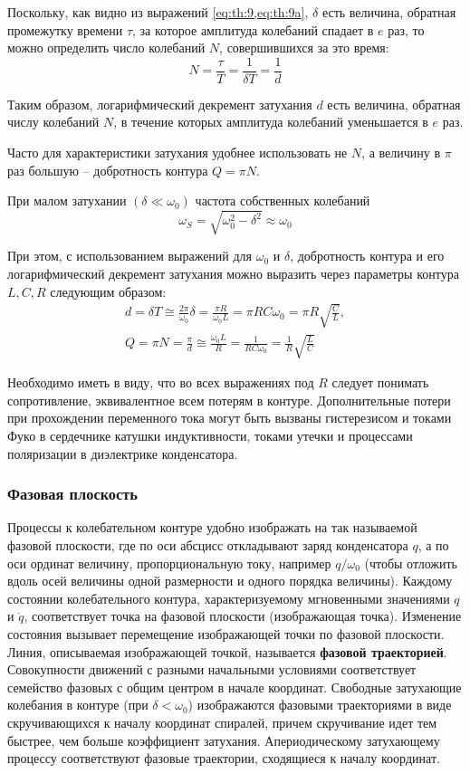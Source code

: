 Поскольку, как видно из выражений \cref{eq:th:9,eq:th:9a}, $\delta$ есть величина, обратная промежутку времени $\tau$, за которое амплитуда колебаний спадает в $e$ раз, то можно определить число колебаний $N$, совершившихся за это время:
\[N = \frac{\tau}{T} = \frac{1}{\delta T} = \frac{1}{d}\]

Таким образом, логарифмический декремент затухания $d$ есть величина, обратная числу колебаний $N$, в течение которых амплитуда колебаний уменьшается в $e$ раз.

Часто для характеристики затухания удобнее использовать не $N$, а величину в $\pi$ раз большую -- добротность контура $Q = \pi N$.

При малом затухании $(\delta \ll \omega_0)$ частота собственных колебаний \[\omega_S = \sqrt{\omega_0^2 - \delta^2} \approx \omega_0\]

При этом, с использованием выражений для $\omega_0$ и $\delta$, добротность контура и его логарифмический декремент затухания можно выразить через параметры контура $L, C, R$ следующим образом:
\begin{gather}
	\label{eq:th:12} d = \delta T \cong \frac{2\pi}{\omega_0} \delta = \frac{\pi R}{\omega_0 L} = \pi R C \omega_0 = \pi R \sqrt{\frac{C}{L}}, \\
	\label{eq:th:13} Q = \pi N = \frac{\pi}{d} \cong \frac{\omega_0 L}{R} = \frac{1}{RC \omega_0} = \frac{1}{R} \sqrt{\frac{L}{C}}
\end{gather}

Необходимо иметь в виду, что во всех выражениях под $R$ следует понимать сопротивление, эквивалентное всем потерям в контуре. Дополнительные потери при прохождении переменного тока могут быть вызваны гистерезисом и токами Фуко в сердечнике катушки индуктивности, токами утечки и процессами поляризации в диэлектрике конденсатора.

\subsubsection{Фазовая плоскость}

Процессы к колебательном контуре удобно изображать на так называемой фазовой плоскости, где по оси абсцисс откладывают заряд конденсатора $q$, а по оси ординат величину, пропорциональную току, например $q/\omega_0$ (чтобы отложить вдоль осей величины одной размерности и одного порядка величины). Каждому состоянии колебательного контура, характеризуемому мгновенными значениями $q$ и $\dot{q}$, соответствует точка на фазовой плоскости (изображающая точка). Изменение состояния вызывает перемещение изображающей точки по фазовой плоскости. Линия, описываемая изображающей точкой, называется \textbf{фазовой траекторией}. Совокупности движений с разными начальными условиями соответствует семейство фазовых с общим центром в начале координат. Свободные затухающие колебания в контуре (при $\delta < \omega_0$) изображаются фазовыми траекториями в виде скручивающихся к началу координат спиралей, причем скручивание идет тем быстрее, чем больше коэффициент затухания. Апериодическому затухающему процессу соответствуют фазовые траектории, сходящиеся к началу координат. 

